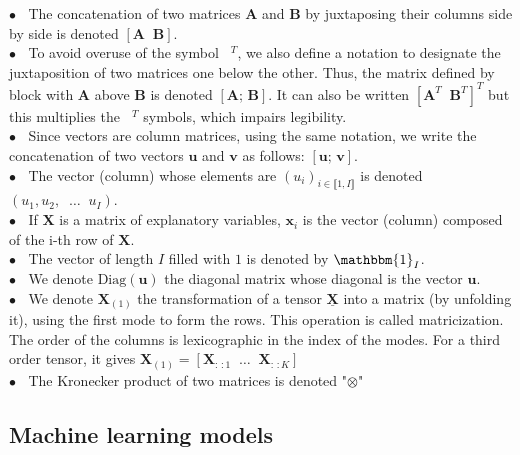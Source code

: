 \documentclass[preprint,12pt]{elsarticle}
\begin{document}
\noindent $\bullet \; \;$ The concatenation of two matrices $\mathbf{A}$ and $\mathbf{B}$ by juxtaposing their columns side by side is denoted $[\mathbf{A} \; \; \mathbf{B}]$.\\
$\bullet \; \;$ To avoid overuse of the symbol $\phantom{a}^T$, we also define a notation to designate the juxtaposition of two matrices one below the other. Thus, the matrix defined by block with $\mathbf{A}$ above $\mathbf{B}$ is denoted $\left[\mathbf{A}; \, \mathbf{B}\right]$. It can also be written $[\mathbf{A}^T \; \; \mathbf{B}^T]^T$ but this multiplies the $\phantom{a}^T$ symbols, which impairs legibility. \\
$\bullet \; \;$ Since vectors are column matrices, using the same notation, we write the concatenation of two vectors $\mathbf{u}$ and $\mathbf{v}$ as follows: $[\mathbf{u}; \, \mathbf{v}]$.  \\
$\bullet \; \;$ The vector (column) whose elements are $(u_i)_{i \in \llbracket 1, I\rrbracket}$ is denoted $(u_1, u_2, \; \; \hdots \;\; u_I)$. \\
$\bullet \; \;$ If $\mathbf{X}$ is a matrix of explanatory variables, $\mathbf{x}_i$ is the vector (column) composed of the i-th row of $\mathbf{X}$.\\
$\bullet \; \;$ The vector of length $I$ filled with $1$ is denoted by $\mathbbm{1}_I$.\\
$\bullet \; \;$ We denote $\text{Diag}(\mathbf{u})$ the diagonal matrix whose diagonal is the vector $\mathbf{u}$. \\
$\bullet \; \;$ We denote $\mathbf{X}_{(1)}$ the transformation of a tensor $\underline{\mathbf{X}}$ into a matrix (by unfolding it), using the first mode to form the rows. This operation is called matricization. The order of the columns is lexicographic in the index of the modes. For a third order tensor, it gives $\mathbf{X}_{(1)} = [\mathbf{X}_{:\,:1} \; \; \ldots \; \;\mathbf{X}_{:\,:K}]$\\
$\bullet \; \;$ The Kronecker product of two matrices is denoted "$\otimes$"




\subsection{Machine learning models}
\label{sec:models}
\end{document}
